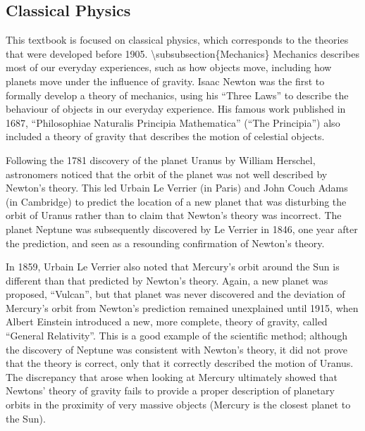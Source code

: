 \documentclass[9pt,Preprint]{lapreprint}
\begin{document}
\subsection{Classical Physics}

This textbook is focused on classical physics, which corresponds to the theories that were developed before 1905.
{\textbackslash}subsubsection\{Mechanics\}
Mechanics describes most of our everyday experiences, such as how objects move, including how planets move under the influence of gravity. Isaac Newton was the first to formally develop a theory of mechanics, using his ``Three Laws'' to describe the behaviour of objects in our everyday experience. His famous work published in 1687, ``Philosophiae Naturalis Principia Mathematica'' (``The Principia'') also included a theory of gravity that describes the motion of celestial objects.

Following the 1781 discovery of the planet Uranus by William Herschel, astronomers noticed that the orbit of the planet was not well described by Newton's theory. This led Urbain Le Verrier (in Paris) and John Couch Adams (in Cambridge) to predict the location of a new planet that was disturbing the orbit of Uranus rather than to claim that Newton's theory was incorrect. The planet Neptune was subsequently discovered by Le Verrier in 1846, one year after the prediction, and seen as a resounding confirmation of Newton's theory.

In 1859, Urbain Le Verrier also noted that Mercury's orbit around the Sun is different than that predicted by Newton's theory. Again, a new planet was proposed, ``Vulcan'', but that planet was never discovered and the deviation of Mercury's orbit from Newton's prediction remained unexplained until 1915, when Albert Einstein introduced a new, more complete, theory of gravity, called ``General Relativity''. This is a good example of the scientific method; although the discovery of Neptune was consistent with Newton's theory, it did not prove that the theory is correct, only that it correctly described the motion of Uranus. The discrepancy that arose when looking at Mercury ultimately showed that Newtons' theory of gravity fails to provide a proper description of planetary orbits in the proximity of very massive objects (Mercury is the closest planet to the Sun).
\end{document}
